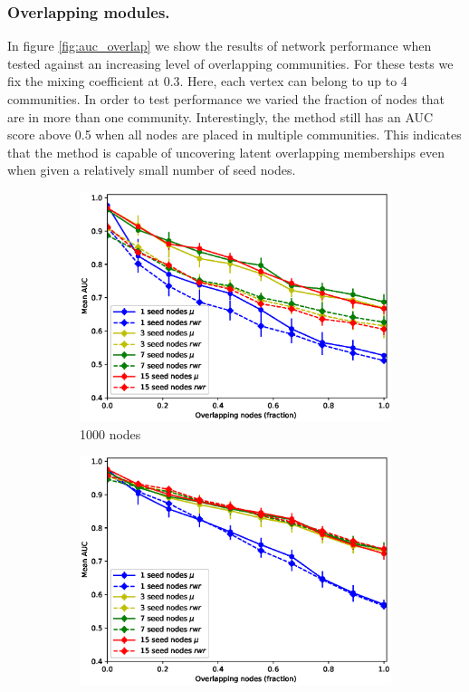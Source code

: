 \documentclass[sigconf]{acmart}
\begin{document}
\subsubsection{Overlapping modules.} 
In figure \ref{fig:auc_overlap} we show the results of network performance when tested against an increasing level of overlapping communities.
For these tests we fix the mixing coefficient at $0.3$.
Here, each vertex can belong to up to 4 communities.
In order to test performance we varied the fraction of nodes that are in more than one community.
Interestingly, the method still has an AUC score above 0.5 when all nodes are placed in multiple communities.
This indicates that the method is capable of uncovering latent overlapping memberships even when given a relatively small number of seed nodes.

\begin{figure}[t]
    \centering
    \begin{subfigure}[b]{0.48\textwidth}
        \centering
        \includegraphics[width=\textwidth]{images/lfr_binary_overlap_auc_1000.eps}
        \caption{1000 nodes}
    \end{subfigure}
    \begin{subfigure}[b]{0.48\textwidth}
        \centering
        \includegraphics[width=\textwidth]{images/lfr_binary_overlap_auc_5000.eps}

\end{subfigure}
\end{figure}
\end{document}
